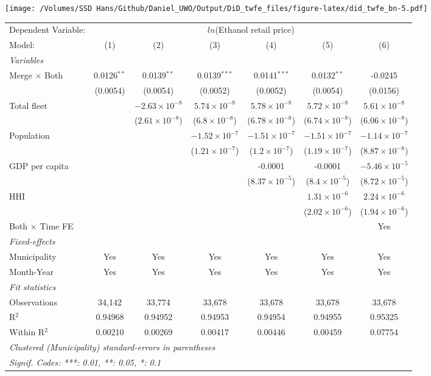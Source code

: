 \documentclass[
]{article}
\begin{document}
\texttt{[image: /Volumes/SSD Hans/Github/Daniel\_UWO/Output/DiD\_twfe\_files/figure-latex/did\_twfe\_bn-5.pdf]}

\begin{tabular}{lcccccc}
\tabularnewline\midrule\midrule
Dependent Variable:&\multicolumn{6}{c}{$ln$(Ethanol retail price)}\\
Model:&(1) & (2) & (3) & (4) & (5) & (6)\\
\midrule \emph{Variables}&   &   &   &   &   &  \\
Merge $\times $ Both & 0.0126$^{**}$ & 0.0139$^{**}$ & 0.0139$^{***}$ & 0.0141$^{***}$ & 0.0132$^{**}$ & -0.0245\\
  &(0.0054) & (0.0054) & (0.0052) & (0.0052) & (0.0054) & (0.0156)\\
Total fleet &    & $-2.63\times 10^{-8}$ & $5.74\times 10^{-8}$ & $5.78\times 10^{-8}$ & $5.72\times 10^{-8}$ & $5.61\times 10^{-8}$\\
  &   & ($2.61\times 10^{-8}$) & ($6.8\times 10^{-8}$) & ($6.78\times 10^{-8}$) & ($6.74\times 10^{-8}$) & ($6.06\times 10^{-8}$)\\
Population &    &    & $-1.52\times 10^{-7}$ & $-1.51\times 10^{-7}$ & $-1.51\times 10^{-7}$ & $-1.14\times 10^{-7}$\\
  &   &    & ($1.21\times 10^{-7}$) & ($1.2\times 10^{-7}$) & ($1.19\times 10^{-7}$) & ($8.87\times 10^{-8}$)\\
GDP per capita &    &    &    & -0.0001 & -0.0001 & $-5.46\times 10^{-5}$\\
  &   &    &    & ($8.37\times 10^{-5}$) & ($8.4\times 10^{-5}$) & ($8.72\times 10^{-5}$)\\
HHI &    &    &    &    & $1.31\times 10^{-6}$ & $2.24\times 10^{-6}$\\
  &   &    &    &    & ($2.02\times 10^{-6}$) & ($1.94\times 10^{-6}$)\\
Both $\times$ Time FE &  &  &  &  &  & Yes\\
\midrule \emph{Fixed-effects}&   &   &   &   &   &  \\
Municipality & Yes & Yes & Yes & Yes & Yes & Yes\\
Month-Year & Yes & Yes & Yes & Yes & Yes & Yes\\
\midrule \emph{Fit statistics}&  & & & & & \\
Observations & 34,142&33,774&33,678&33,678&33,678&33,678\\
R$^2$ & 0.94968&0.94952&0.94953&0.94954&0.94955&0.95325\\
Within R$^2$ & 0.00210&0.00269&0.00417&0.00446&0.00459&0.07754\\
\midrule\midrule\multicolumn{7}{l}{\emph{Clustered (Municipality) standard-errors in parentheses}}\\
\multicolumn{7}{l}{\emph{Signif. Codes: ***: 0.01, **: 0.05, *: 0.1}}\\
\end{tabular}
\end{document}
